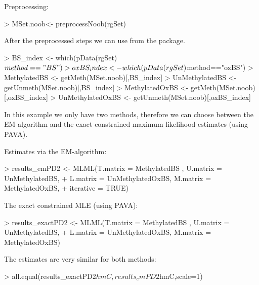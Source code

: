 \documentclass{article}
\begin{document}
Preprocessing:
\begin{Schunk}
\begin{Sinput}
> MSet.noob<- preprocessNoob(rgSet)
\end{Sinput}
\end{Schunk}


After the preprocessed steps we can use  from the  package.


\begin{Schunk}
\begin{Sinput}
> BS_index <- which(pData(rgSet)$method=="BS")
> oxBS_index <- which(pData(rgSet)$method=="oxBS")
> MethylatedBS <- getMeth(MSet.noob)[,BS_index]
> UnMethylatedBS <- getUnmeth(MSet.noob)[,BS_index]
> MethylatedOxBS <- getMeth(MSet.noob)[,oxBS_index]
> UnMethylatedOxBS <- getUnmeth(MSet.noob)[,oxBS_index]
\end{Sinput}
\end{Schunk}





In this example we only have two methods, therefore we can choose between the EM-algorithm and the exact constrained maximum likelihood estimates (using PAVA).

Estimates via the EM-algorithm:

\begin{Schunk}
\begin{Sinput}
> results_emPD2 <- MLML(T.matrix = MethylatedBS , U.matrix = UnMethylatedBS,
+                    L.matrix = UnMethylatedOxBS, M.matrix = MethylatedOxBS,
+                    iterative = TRUE)
\end{Sinput}
\end{Schunk}




The exact constrained MLE (using PAVA):

\begin{Schunk}
\begin{Sinput}
> results_exactPD2 <- MLML(T.matrix = MethylatedBS , U.matrix = UnMethylatedBS,
+                       L.matrix = UnMethylatedOxBS, M.matrix = MethylatedOxBS)
\end{Sinput}
\end{Schunk}

The estimates are very similar for both methods:
\begin{Schunk}
\begin{Sinput}
> all.equal(results_exactPD2$hmC,results_emPD2$hmC,scale=1)
\end{Sinput}
\end{Schunk}
\end{document}
